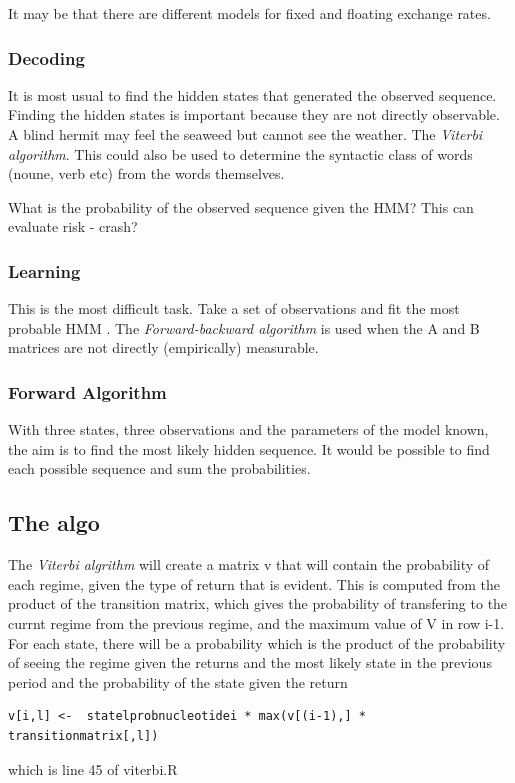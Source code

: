 \documentclass[12pt, a4paper, oneside]{article} %
\begin{document}
It may be that there are different models for fixed and floating exchange rates. 
\subsubsection{Decoding}
It is most usual to find the hidden states that generated the observed sequence.  Finding the hidden states is important because they are not directly observable.  A blind hermit may feel the seaweed but cannot see the weather. The \emph{Viterbi algorithm}.  This could also be used to determine the syntactic class of words (noune, verb etc) from the words themselves.  

What is the probability of the observed sequence given the HMM? This can evaluate risk - crash? 

\subsubsection{Learning}
This is the most difficult task.  Take a set of observations and fit the most probable HMM . The \emph{Forward-backward algorithm} is used when the A and B matrices are not directly (empirically) measurable.  

\subsubsection{Forward Algorithm}
With three states, three observations and the parameters of the model known, the aim is to find the most likely hidden sequence.  It would be possible to find each possible sequence and sum the probabilities.  





\subsection{The algo}
The \emph{Viterbi algrithm} will create a matrix v that will contain the probability of each regime, given the type of return that is evident. This is computed from the product of the transition matrix, which gives the probability of transfering to the currnt regime from the previous regime, and the maximum value of V in row i-1.  For each state, there will be a probability which is the product of the probability of seeing the regime given the returns and the most likely state in the previous period and the probability of the state given the return \begin{verbatim}v[i,l] <-  statelprobnucleotidei * max(v[(i-1),] * transitionmatrix[,l])\end{verbatim} which is line 45 of viterbi.R
\end{document}
